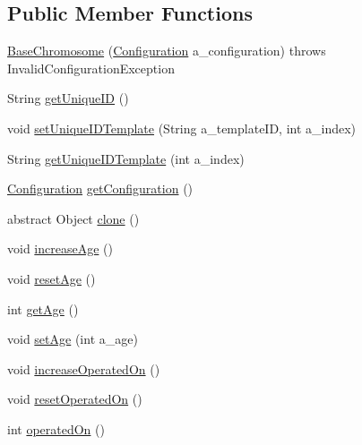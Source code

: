 \subsection*{Public Member Functions}
\begin{DoxyCompactItemize}
\item 
\hyperlink{classorg_1_1jgap_1_1_base_chromosome_a94e1af5ba804061833ed3883d42f9441}{Base\-Chromosome} (\hyperlink{classorg_1_1jgap_1_1_configuration}{Configuration} a\-\_\-configuration)  throws Invalid\-Configuration\-Exception 
\item 
String \hyperlink{classorg_1_1jgap_1_1_base_chromosome_a8cf998c46fddd9ee2f8bfcd2a7b6bffa}{get\-Unique\-I\-D} ()
\item 
void \hyperlink{classorg_1_1jgap_1_1_base_chromosome_a06156bb0f2c8512ca6a7f7f0fee305b9}{set\-Unique\-I\-D\-Template} (String a\-\_\-template\-I\-D, int a\-\_\-index)
\item 
String \hyperlink{classorg_1_1jgap_1_1_base_chromosome_a2d23cfd243723be4d5eb775532e36a6e}{get\-Unique\-I\-D\-Template} (int a\-\_\-index)
\item 
\hyperlink{classorg_1_1jgap_1_1_configuration}{Configuration} \hyperlink{classorg_1_1jgap_1_1_base_chromosome_a104b33f29941ba6ba405889964fc2bf5}{get\-Configuration} ()
\item 
abstract Object \hyperlink{classorg_1_1jgap_1_1_base_chromosome_a97071ef6dba552c1c1f2b2780d27eec3}{clone} ()
\item 
void \hyperlink{classorg_1_1jgap_1_1_base_chromosome_a6dcae8b12cad267f6f91431281869e02}{increase\-Age} ()
\item 
void \hyperlink{classorg_1_1jgap_1_1_base_chromosome_a7d4483ef679d0e1eb335256b72ab0731}{reset\-Age} ()
\item 
int \hyperlink{classorg_1_1jgap_1_1_base_chromosome_af987f6a74486145a139985297c18ae80}{get\-Age} ()
\item 
void \hyperlink{classorg_1_1jgap_1_1_base_chromosome_aaf9e8ca50d99c27775ce186613320624}{set\-Age} (int a\-\_\-age)
\item 
void \hyperlink{classorg_1_1jgap_1_1_base_chromosome_a89c0c0959ca4af0152520a2d6c512edd}{increase\-Operated\-On} ()
\item 
void \hyperlink{classorg_1_1jgap_1_1_base_chromosome_a93a541bdb76c316543a201e8718dd29c}{reset\-Operated\-On} ()
\item 
int \hyperlink{classorg_1_1jgap_1_1_base_chromosome_a86349c8e5dbe93c54580a283f70ea2d0}{operated\-On} ()
\item 

\end{DoxyCompactItemize}
